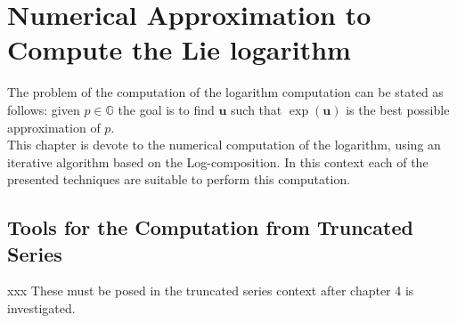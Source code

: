 \chapter{Numerical Approximation to Compute the Lie logarithm}\label{ch:lie_log_computation}

The problem of the computation of the logarithm computation can be stated as follows:
given $p \in \mathbb{G}$ the goal is to find $\mathbf{u}$ such that $\exp(\mathbf{u})$ is the best possible approximation of $p$.  \\
This chapter is devote to the numerical computation of the logarithm, using an iterative algorithm based on the Log-composition. In this context each of the presented techniques are suitable to perform this computation.


\section{Tools for the Computation from Truncated Series}

\noindent
xxx These must be posed in the truncated series context after chapter 4 is investigated.\\

